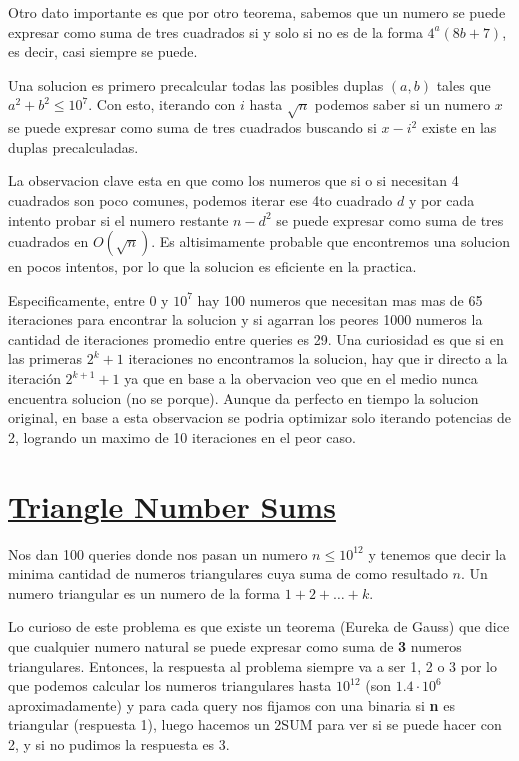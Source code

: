 \documentclass{article}
\begin{document}
Otro dato importante es que por otro teorema, sabemos que un numero se puede expresar como suma de tres cuadrados si y solo si no es de la forma $4^a(8b + 7)$, es decir, casi siempre se puede.

Una solucion es primero precalcular todas las posibles duplas $(a, b)$ tales que $a^2 + b^2 \leq 10^7$. Con esto, iterando con $i$ hasta $\sqrt{n}$ podemos saber si un numero $x$ se puede expresar como suma de tres cuadrados buscando si $x - i^2$ existe en las duplas precalculadas.

La observacion clave esta en que como los numeros que si o si necesitan 4 cuadrados son poco comunes, podemos iterar ese 4to cuadrado $d$ y por cada intento probar si el numero restante $n - d^2$ se puede expresar como suma de tres cuadrados en $O(\sqrt{n})$. Es altisimamente probable que encontremos una solucion en pocos intentos, por lo que la solucion es eficiente en la practica.

Especificamente, entre 0 y $10^7$ hay 100 numeros que necesitan mas mas de 65 iteraciones para encontrar la solucion y si agarran los peores 1000 numeros la cantidad de iteraciones promedio entre queries es 29. Una curiosidad es que si en las primeras $2^k + 1$ iteraciones no encontramos la solucion, hay que ir directo a la iteración $2^{k + 1} + 1$ ya que en base a la obervacion veo que en el medio nunca encuentra solucion (no se porque). Aunque da perfecto en tiempo la solucion original, en base a esta observacion se podria optimizar solo iterando potencias de 2, logrando un maximo de 10 iteraciones en el peor caso.

\section{\href{https://cses.fi/problemset/task/3406}{Triangle Number Sums}}
Nos dan 100 queries donde nos pasan un numero $n \leq 10^{12}$ y tenemos que decir la minima cantidad de numeros triangulares cuya suma de como resultado $n$. Un numero triangular es un numero de la forma $1 + 2+ \dots + k$.

Lo curioso de este problema es que existe un teorema (Eureka de Gauss) que dice que cualquier numero natural se puede expresar como suma de \textbf{3} numeros triangulares. Entonces, la respuesta al problema siempre va a ser 1, 2 o 3 por lo que podemos calcular los numeros triangulares hasta $10^{12}$ (son $1.4 \cdot 10^6$ aproximadamente) y para cada query nos fijamos con una binaria si \textbf{n} es triangular (respuesta 1), luego hacemos un 2SUM para ver si se puede hacer con 2, y si no pudimos la respuesta es 3.
\end{document}
